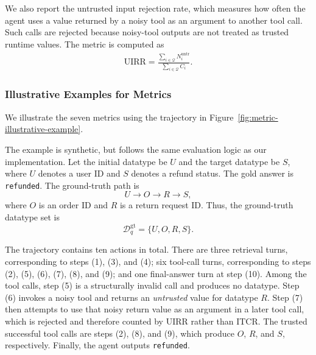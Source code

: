 We also report the untrusted input rejection rate, which measures how often the agent uses a value returned by a noisy tool as an argument to another tool call.
Such calls are rejected because noisy-tool outputs are not treated as trusted runtime values.
The metric is computed as
\begin{equation}
\begin{aligned}
\mathrm{UIRR} = \frac{\sum_{i \in \mathcal{Q}} N_i^{\mathrm{untr}}}{\sum_{i \in \mathcal{Q}} C_i}.
\end{aligned}
\end{equation}

\subsubsection{Illustrative Examples for Metrics}
\label{app:metric-illustrative-examples}


We illustrate the seven metrics using the trajectory in Figure~\ref{fig:metric-illustrative-example}. 

The example is synthetic, but follows the same evaluation logic as our implementation. 
Let the initial datatype be $U$ and the target datatype be $S$, where $U$ denotes a user ID and $S$ denotes a refund status. 
The gold answer is \texttt{refunded}. 
The ground-truth path is
\begin{equation}
U \rightarrow O \rightarrow R \rightarrow S,
\end{equation}
where $O$ is an order ID and $R$ is a return request ID. 
Thus, the ground-truth datatype set is
\begin{equation}
\mathcal{D}^{\mathrm{gt}}_q = \{U,O,R,S\}.
\end{equation}

The trajectory contains ten actions in total. 
There are three retrieval turns, corresponding to steps (1), (3), and (4); six tool-call turns, corresponding to steps (2), (5), (6), (7), (8), and (9); and one final-answer turn at step (10).
Among the tool calls, step (5) is a structurally invalid call and produces no datatype.
Step (6) invokes a noisy tool and returns an \emph{untrusted} value for datatype $R$.
Step (7) then attempts to use that noisy return value as an argument in a later tool call, which is rejected and therefore counted by UIRR rather than ITCR.
The trusted successful tool calls are steps (2), (8), and (9), which produce $O$, $R$, and $S$, respectively.
Finally, the agent outputs \texttt{refunded}.


